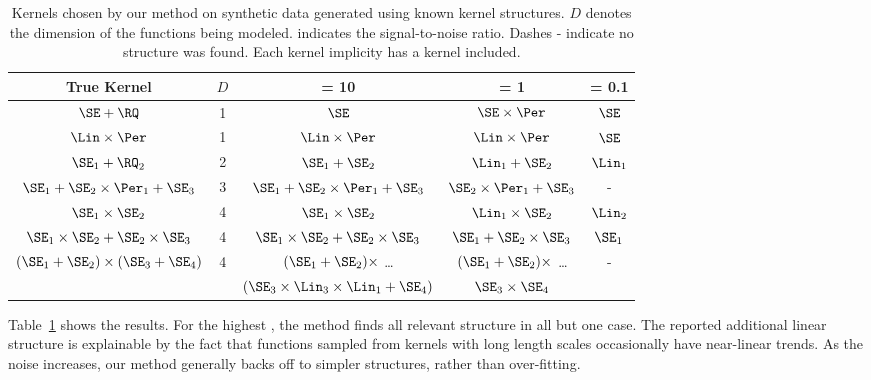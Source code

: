 \begin{table}[ht!]
\caption[Kernels recovered on synthetic data]
{
Kernels chosen by our method on synthetic data generated using known kernel structures. $D$ denotes the dimension of the functions being modeled.
\SNR{} indicates the signal-to-noise ratio.
Dashes - indicate no structure was found.
Each kernel implicity has a \kWN{} kernel included.
}
\label{tbl:synthetic}
\begin{center}
{\small
\begin{tabular}{c c | c c c}
True Kernel & $D$ & \SNR{} = 10 & \SNR{} = 1 & \hspace{-1cm} \SNR{} = 0.1 \\
\hline
$\SE + \RQ$        & 1 & $\SE$ & $\SE \times \Per$ & $\SE$ \\
$\Lin \times \Per$ & 1 & $\Lin \times \Per$ & $\Lin \times \Per$ & $\SE$ \\
$\SE_1 + \RQ_2$    & 2 & $\SE_1 + \SE_2$ & $\Lin_1 + \SE_2$ & $\Lin_1$ \\
$\SE_1 + \SE_2 \times \Per_1 + \SE_3$ & 3 & $\SE_1 + \SE_2 \times \Per_1 + \SE_3$ & $\SE_2 \times \Per_1 + \SE_3$ & - \\
$\SE_1 \times \SE_2$ & 4 & $\SE_1 \times \SE_2$ & $\Lin_1 \times \SE_2$ & $\Lin_2$ \\
$\SE_1 \times \SE_2 + \SE_2 \times \SE_3$ & 4 & $\SE_1 \times \SE_2 + \SE_2 \times \SE_3$ & $\SE_1 + \SE_2 \times \SE_3$ & $\SE_1$ \\
\multirow{2}{*}{ $(\SE_1 + \SE_2) \times (\SE_3 + \SE_4)$ } & \multirow{2}{*}{4} & $(\SE_1 + \SE_2) \times$ \dots & $(\SE_1 + \SE_2) \times$ \dots & \multirow{2}{*}{-} \\
 & & $(\SE_3\times\Lin_3\times\Lin_1 + \SE_4)$ & $\SE_3 \times \SE_4$ &
\end{tabular}
}
\end{center}
\end{table}


Table~\ref{tbl:synthetic} shows the results.
%
For the highest \SNR{}, the method finds all relevant structure in all but one case.
The reported additional linear structure is explainable by the fact that functions sampled from \kSE{} kernels with long length scales occasionally have near-linear trends.
As the noise increases, our method generally backs off to simpler structures, rather than over-fitting.

